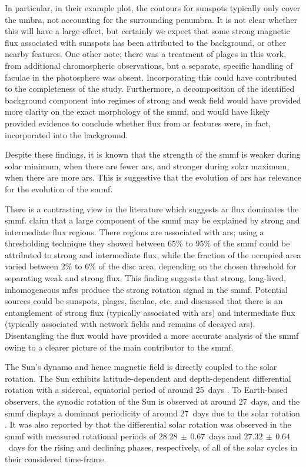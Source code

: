 In particular, in their example plot, the contours for sunspots typically only cover the umbra, not accounting for the surrounding penumbra. It is not clear whether this will have a large effect, but certainly we expect that some strong magnetic flux associated with sunspots has been attributed to the background, or other nearby features. One other note; there was a treatment of plages in this work, from additional chromospheric observations, but a separate, specific handling of faculae in the photosphere was absent. Incorporating this could have contributed to the completeness of the study. Furthermore, a decomposition of the identified background component into regimes of strong and weak field would have provided more clarity on the exact morphology of the \gls{smmf}, and would have likely provided evidence to conclude whether flux from \gls{ar} features were, in fact, incorporated into the background.

Despite these findings, it is known that the strength of the \gls{smmf} is weaker during solar minimum, when there are fewer \glspl{ar}, and stronger during solar maximum, when there are more \glspl{ar}. This is suggestive that the evolution of \glspl{ar} has relevance for the evolution of the \gls{smmf}.

There is a contrasting view in the literature which suggests \gls{ar} flux dominates the \gls{smmf}. \citet{kutsenko_contribution_2017} claim that a large component of the \gls{smmf} may be explained by strong and intermediate flux regions. There regions are associated with \glspl{ar}; using a thresholding technique they showed between $65 \%$ to $95 \%$ of the \gls{smmf} could be attributed to strong and intermediate flux, while the fraction of the occupied area varied between $2 \%$ to $6 \%$ of the disc area, depending on the chosen threshold for separating weak and strong flux. This finding suggests that strong, long-lived, inhomogeneous \gls{mfc}s produce the strong rotation signal in the \gls{smmf}. Potential sources could be sunspots, plages, faculae, etc. and \citet{kutsenko_contribution_2017} discussed that there is an entanglement of strong flux (typically associated with \glspl{ar}) and intermediate flux (typically associated with network fields and remains of decayed \glspl{ar}). Disentangling the flux would have provided a more accurate analysis of the \gls{smmf} owing to a clearer picture of the main contributor to the \gls{smmf}.

The Sun's dynamo and hence magnetic field is directly coupled to the solar rotation. The Sun exhibits latitude-dependent and depth-dependent differential rotation with a sidereal, equatorial period of around 25~days \citep{howe_solar_2009}. To Earth-based observers, the synodic rotation of the Sun is observed at around 27~days, and the \gls{smmf} displays a dominant periodicity of around 27~days due to the solar rotation \citep{chaplin_studies_2003, xie_temporal_2017, bose_variability_2018}. It was also reported by \citet{xie_temporal_2017} that the differential solar rotation was observed in the \gls{smmf} with measured rotational periods of $28.28 \, \pm \, 0.67$~days and $27.32 \, \pm \, 0.64$~days for the rising and declining phases, respectively, of all of the solar cycles in their considered time-frame.

